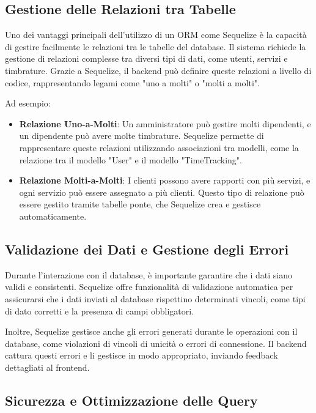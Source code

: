 \documentclass[twoside]{supsistudent}
\begin{document}
\subsection{Gestione delle Relazioni tra Tabelle}

Uno dei vantaggi principali dell'utilizzo di un ORM come Sequelize è la capacità di gestire facilmente le relazioni tra le tabelle del database. Il sistema richiede la gestione di relazioni complesse tra diversi tipi di dati, come utenti, servizi e timbrature. Grazie a Sequelize, il backend può definire queste relazioni a livello di codice, rappresentando legami come "uno a molti" o "molti a molti".

Ad esempio:

\begin{itemize}
  \item \textbf{Relazione Uno-a-Molti}: Un amministratore può gestire molti dipendenti, e un dipendente può avere molte timbrature. Sequelize permette di rappresentare queste relazioni utilizzando associazioni tra modelli, come la relazione tra il modello "User" e il modello "TimeTracking".

  \item \textbf{Relazione Molti-a-Molti}: I clienti possono avere rapporti con più servizi, e ogni servizio può essere assegnato a più clienti. Questo tipo di relazione può essere gestito tramite tabelle ponte, che Sequelize crea e gestisce automaticamente.
\end{itemize}

\subsection{Validazione dei Dati e Gestione degli Errori}

Durante l'interazione con il database, è importante garantire che i dati siano validi e consistenti. Sequelize offre funzionalità di validazione automatica per assicurarsi che i dati inviati al database rispettino determinati vincoli, come tipi di dato corretti e la presenza di campi obbligatori.

Inoltre, Sequelize gestisce anche gli errori generati durante le operazioni con il database, come violazioni di vincoli di unicità o errori di connessione. Il backend cattura questi errori e li gestisce in modo appropriato, inviando feedback dettagliati al frontend.

\subsection{Sicurezza e Ottimizzazione delle Query}
\end{document}
